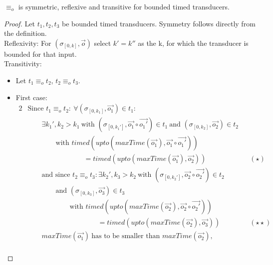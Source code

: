 \begin{lemma}[name=Observational Equivalence is an Equivalence Relationship for Bounded Transducers]\label{lemma:observational_equivalence_equivalence_relationship}
  \(\equiv_o\) is symmetric, reflexive and transitive for bounded timed transducers.
\end{lemma}
\begin{proof}
  Let \(t_1, t_2, t_3\) be bounded timed transducers.
  Symmetry follows directly from the definition.\\
  Reflexivity: For \((\sigma_{[0,k]}, \vec{o})\) select \(k' = k''\) as the k, for which the transducer is bounded for that input.\\
  Transitivity:
  \begin{itemize}
    \item Let \(t_1 \equiv_o t_2\), \(t_2 \equiv_o t_3\).
    \item First case:
      \begin{alignat*}{2}
        &\text{Since } t_1 \equiv_o t_2:\ \forall (\sigma_{[0,k_1]}, \vec{o_1}) \in t_1: \\
        &\hspace{2em} \exists k_1', k_2 > k_1\ \text{with } (\sigma_{[0,k_1']}, \vec{o_1}\circ\vec{o_1'}) \in t_1\ \text{and } (\sigma_{[0,k_2]}, \vec{o_2}) \in t_2 \\
        &\hspace{4em} \text{with } \mathit{timed}(\mathit{upto}(\mathit{maxTime}(\vec{o_1}),\vec{o_1} \circ \vec{o_1'} )) \\
        &\hspace{8em} = \mathit{timed}(\mathit{upto}(\mathit{maxTime}(\vec{o_1}),\vec{o_2})) && (\star)\\
        &\hspace{2em} \text{and since } t_2 \equiv_o t_3: \exists k_2', k_3 > k_2\ \text{with } (\sigma_{[0,k_2']}, \vec{o_2}\circ\vec{o_2'}) \in t_2 \\
        &\hspace{4em} \text{and } (\sigma_{[0,k_3]}, \vec{o_3}) \in t_3 \\
        &\hspace{6em} \text{with } \mathit{timed}(\mathit{upto}(\mathit{maxTime}(\vec{o_2}),\vec{o_2} \circ \vec{o_2'} )) \\
        &\hspace{10em} = \mathit{timed}(\mathit{upto}(\mathit{maxTime}(\vec{o_2}),\vec{o_3})) && (\star\star)\\
        &\hspace{2em} \mathit{maxTime}(\vec{o_1})\ \text{has to be smaller than }\mathit{maxTime}(\vec{o_2}), \\

\end{alignat*}
\end{itemize}
\end{proof}
